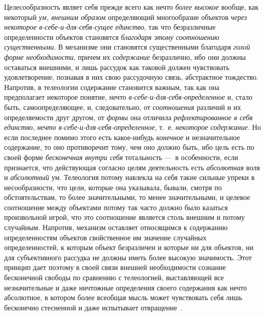 \documentclass[twoside]{article}
\begin{document}
{{{{Целесообразность являет себя прежде всего как нечто
{\em более высокое}
вообще, как некоторый
{\em ум, внешним образом}
определяющий многообразие объектов
{\em через некоторое
в-себе-и-для-себя-сущее единство}, так что безразличные
определенности объектов становятся
{\em благодаря этому соотношению
существенными}. В механизме они становятся существенными
благодаря {\em голой форме
необходимости}, причем их
{\em содержание}
безразлично, ибо они должны оставаться внешними, и лишь
рассудок как таковой должен чувствовать удовлетворение, познавая в них свою
рассудочную связь, абстрактное тождество. Напротив, в телеологии содержание
становится важным, так как она предполагает некоторое понятие, нечто
{\em в-себе-и-для-себя-определенное}
и, стало быть, самоопределяющее, и, следовательно, от
{\em соотношения}
различий и их определяемости друг другом, от
{\em формы} она отличила
{\em рефлектированное в себя единство},
{\em нечто
в-себе-и-для-себя-определенное}, т.~е.
{\em некоторое содержание}.
Но если последнее помимо этого есть какое-нибудь
{\em конечное} и
незначительное содержание, то оно противоречит тому, чем оно должно быть,
ибо цель есть по своей форме
{\em бесконечная внутри себя}
тотальность —~в особенности, если признается,
что действующая согласно целям деятельность есть
{\em абсолютная} воля и
{\em абсолютный} ум.
Телеология потому навлекла на себя такие сильные упреки в несообразности,
что цели, которые она указывала, бывали, смотря по обстоятельствам, то
более значительными, то менее значительными, и целевое соотношение между
объектами потому так часто должно было казаться произвольной игрой, что это
соотношение является столь внешним и потому случайным. Напротив, механизм
оставляет относящимся к содержанию определенностям объектов свойственное им
значение случайных определенностей, к которым объект безразличен и которые
ни для объектов, ни для субъективного рассудка не должны
иметь более высокую значимость. Этот принцип дает поэтому в своей связи
внешней необходимости сознание бесконечной свободы по сравнению с
телеологией, выставляющей все незначительные и даже ничтожные определения
своего содержания как нечто абсолютное, в котором более всеобщая мысль
может чувствовать себя лишь бесконечно стесненной и даже испытывает
отвращение~\label{bkm:bm84}.

}}}}
\end{document}
